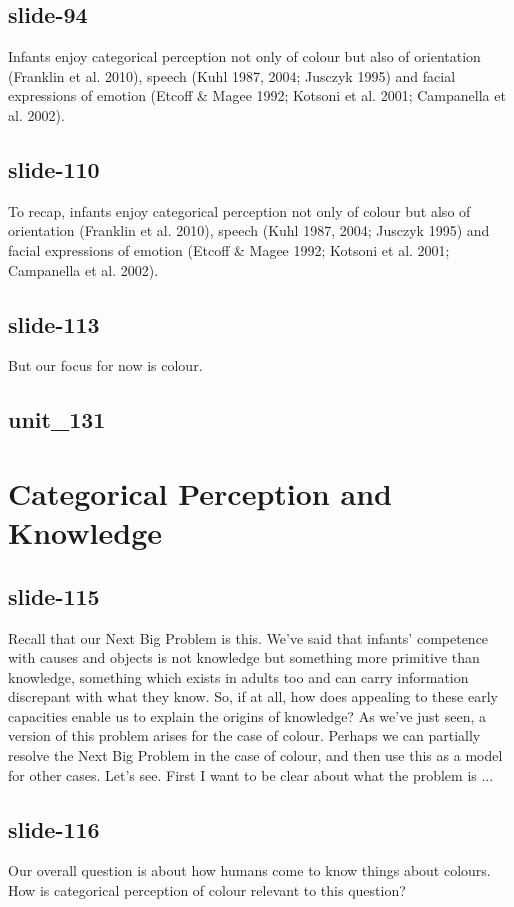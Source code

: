 \documentclass[12pt,\papersize]{extarticle}
\begin{document}
 
\subsection{slide-94}
Infants enjoy categorical perception not only of colour but also of orientation (Franklin et al. 2010), speech (Kuhl 1987, 2004; Jusczyk 1995) and facial expressions of emotion (Etcoff \& Magee 1992; Kotsoni et al. 2001; Campanella et al. 2002).
 
 
\subsection{slide-110}
To recap, infants enjoy categorical perception not only of colour but also of orientation (Franklin et al. 2010), speech (Kuhl 1987, 2004; Jusczyk 1995) and facial expressions of emotion (Etcoff \& Magee 1992; Kotsoni et al. 2001; Campanella et al. 2002).
 
 
\subsection{slide-113}
But our focus for now is colour.
 
 
\subsection{unit\_131}
 
\section{Categorical Perception and Knowledge}
 
 
\subsection{slide-115}
Recall that our Next Big Problem is this. We've said that infants' competence with causes and objects is not knowledge but something more primitive than knowledge, something which exists in adults too and can carry information discrepant with what they know. So, if at all, how does appealing to these early capacities enable us to explain the origins of knowledge?
As we've just seen, a version of this problem arises for the case of colour. Perhaps we can partially resolve the Next Big Problem in the case of colour, and then use this as a model for other cases.
Let's see. First I want to be clear about what the problem is ...
 
 
\subsection{slide-116}
Our overall question is about how humans come to know things about colours.
How is categorical perception of colour relevant to this question?
 
\end{document}
